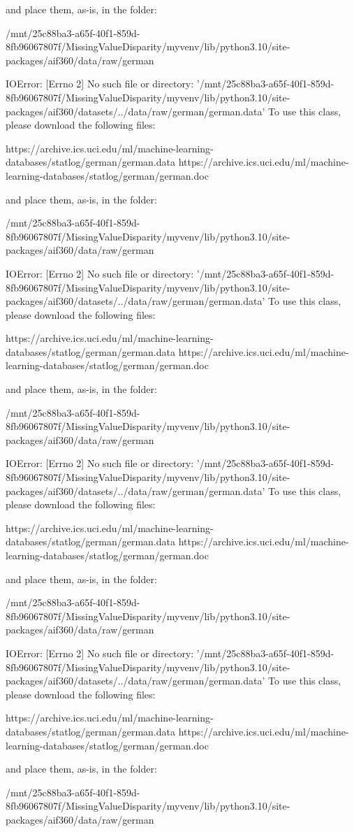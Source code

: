 and place them, as-is, in the folder:

	/mnt/25c88ba3-a65f-40f1-859d-8fb96067807f/MissingValueDisparity/myvenv/lib/python3.10/site-packages/aif360/data/raw/german

IOError: [Errno 2] No such file or directory: '/mnt/25c88ba3-a65f-40f1-859d-8fb96067807f/MissingValueDisparity/myvenv/lib/python3.10/site-packages/aif360/datasets/../data/raw/german/german.data'
To use this class, please download the following files:

	https://archive.ics.uci.edu/ml/machine-learning-databases/statlog/german/german.data
	https://archive.ics.uci.edu/ml/machine-learning-databases/statlog/german/german.doc

and place them, as-is, in the folder:

	/mnt/25c88ba3-a65f-40f1-859d-8fb96067807f/MissingValueDisparity/myvenv/lib/python3.10/site-packages/aif360/data/raw/german

IOError: [Errno 2] No such file or directory: '/mnt/25c88ba3-a65f-40f1-859d-8fb96067807f/MissingValueDisparity/myvenv/lib/python3.10/site-packages/aif360/datasets/../data/raw/german/german.data'
To use this class, please download the following files:

	https://archive.ics.uci.edu/ml/machine-learning-databases/statlog/german/german.data
	https://archive.ics.uci.edu/ml/machine-learning-databases/statlog/german/german.doc

and place them, as-is, in the folder:

	/mnt/25c88ba3-a65f-40f1-859d-8fb96067807f/MissingValueDisparity/myvenv/lib/python3.10/site-packages/aif360/data/raw/german

IOError: [Errno 2] No such file or directory: '/mnt/25c88ba3-a65f-40f1-859d-8fb96067807f/MissingValueDisparity/myvenv/lib/python3.10/site-packages/aif360/datasets/../data/raw/german/german.data'
To use this class, please download the following files:

	https://archive.ics.uci.edu/ml/machine-learning-databases/statlog/german/german.data
	https://archive.ics.uci.edu/ml/machine-learning-databases/statlog/german/german.doc

and place them, as-is, in the folder:

	/mnt/25c88ba3-a65f-40f1-859d-8fb96067807f/MissingValueDisparity/myvenv/lib/python3.10/site-packages/aif360/data/raw/german

IOError: [Errno 2] No such file or directory: '/mnt/25c88ba3-a65f-40f1-859d-8fb96067807f/MissingValueDisparity/myvenv/lib/python3.10/site-packages/aif360/datasets/../data/raw/german/german.data'
To use this class, please download the following files:

	https://archive.ics.uci.edu/ml/machine-learning-databases/statlog/german/german.data
	https://archive.ics.uci.edu/ml/machine-learning-databases/statlog/german/german.doc

and place them, as-is, in the folder:

	/mnt/25c88ba3-a65f-40f1-859d-8fb96067807f/MissingValueDisparity/myvenv/lib/python3.10/site-packages/aif360/data/raw/german

